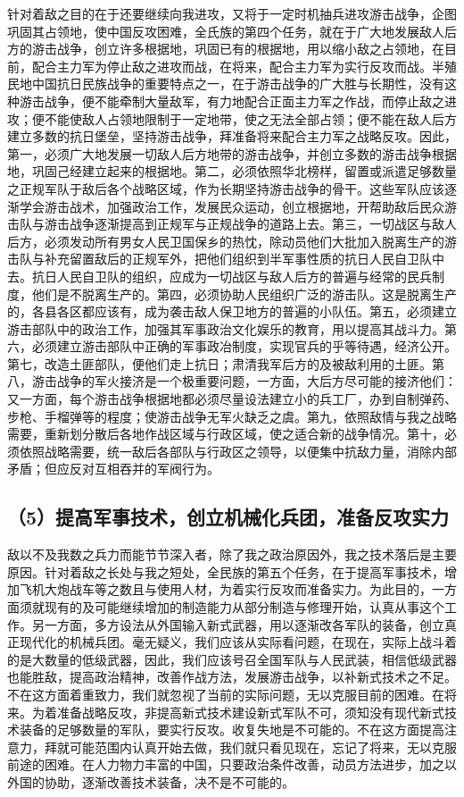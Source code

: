 针对着敌之目的在于还要继续向我进攻，又将于一定时机抽兵进攻游击战争，企图巩固其占领地，使中国反攻困难，全氏族的第四个任务，就在于广大地发展敌人后方的游击战争，创立许多根据地，巩固已有的根据地，用以缩小敌之占领地，在目前，配合主力军为停止敌之进攻而战，在将来，配合主力军为实行反攻而战。半殖民地中国抗日民族战争的重要特点之一，在于游击战争的广大胜与长期性，没有这种游击战争，便不能牵制大量敌军，有力地配合正面主力军之作战，而停止敌之进攻；便不能使敌人占领地限制于一定地带，使之无法全部占领；便不能在敌人后方建立多数的抗日堡垒，坚持游击战争，拜准备将来配合主力军之战略反攻。因此，第一，必须广大地发展一切敌人后方地带的游击战争，并创立多数的游击战争根据地，巩固己经建立起来的根据地。第二，必须依照华北榜样，留置或派遣足够数量之正规军队于敌后各个战略区域，作为长期坚持游击战争的骨干。这些军队应该逐渐学会游击战术，加强政治工作，发展民众运动，创立根据地，开帮助敌后民众游击队与游击战争逐渐提高到正规军与正规战争的道路上去。第三，一切战区与敌人后方，必须发动所有男女人民卫国保乡的热忱，除动员他们大批加入脱离生产的游击队与补充留置敌后的正规军外，把他们组织到半军事性质的抗日人民自卫队中去。抗日人民自卫队的组织，应成为一切战区与敌人后方的普遍与经常的民兵制度，他们是不脱离生产的。第四，必须协助人民组织广泛的游击队。这是脱离生产的，各县各区都应该有，成为袭击敌人保卫地方的普遍的小队伍。第五，必须建立游击部队中的政治工作，加强其军事政治文化娱乐的教育，用以提高其战斗力。第六，必须建立游击部队中正确的军事政冶制度，实现官兵的乎等待遇，经济公开。第七，改造土匪部队，便他们走上抗日；肃清我军后方的及被敌利用的土匪。第八，游击战争的军火接济是一个极重要问题，一方面，大后方尽可能的接济他们：又一方面，每个游击战争根据地都必须尽量设法建立小的兵工厂，办到自制弹药、步枪、手榴弹等的程度；使游击战争无军火缺乏之虞。第九，依照敌情与我之战略需要，重新划分散后各地作战区域与行政区域，使之适合新的战争情况。第十，必须依照战略需要，统一敌后各部队与行政区之领导，以便集中抗敌力量，消除内部矛盾；但应反对互相吞并的军阀行为。

\subsection{（5）提高军事技术，创立机械化兵团，准备反攻实力}

敌以不及我数之兵力而能节节深入者，除了我之政治原因外，我之技术落后是主要原因。针对着敌之长处与我之短处，全民族的第五个任务，在于提高军事技术，增加飞机大炮战车等之数且与使用人材，为着实行反攻而准备实力。为此目的，一方面须就现有的及可能继续增加的制造能力从部分制造与修理开始，认真从事这个工作。另一方面，多方设法从外国输入新式武器，用以逐渐改各军队的装备，创立真正现代化的机械兵团。毫无疑义，我们应该从实际看问题，在现在，实际上战斗着的是大数量的低级武器，因此，我们应该号召全国军队与人民武装，相信低级武器也能胜敌，提高政治精神，改善作战方法，发展游击战争，以补新式技术之不足。不在这方面着重致力，我们就忽视了当前的实际问题，无以克服目前的困难。在将来。为着准备战略反攻，非提高新式技术建设新式军队不可，须知没有现代新式技术装备的足够数量的军队，要实行反攻。收复失地是不可能的。不在这方面提高注意力，拜就可能范围内认真开始去做，我们就只看见现在，忘记了将来，无以克服前途的困难。在人力物力丰富的中国，只要政治条件改善，动员方法进步，加之以外国的协助，逐渐改善技术装备，决不是不可能的。

